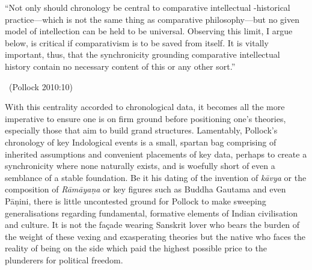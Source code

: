 \begin{myquote}
“Not only should chronology be central to comparative intellectual -historical practice—which is not the same thing as comparative philosophy—but no given model of intellection can be held to be universal. Observing this limit, I argue below, is critical if comparativism is to be saved from itself. It is vitally important, thus, that the synchronicity grounding comparative intellectual history contain no necessary content of this or any other sort.” 

~\hfill (Pollock 2010:10)
\end{myquote}

\newpage

With this centrality accorded to chronological data, it becomes all the more imperative to ensure one is on firm ground before positioning one’s theories, especially those that aim to build grand structures. Lamentably, Pollock’s chronology of key Indological events is a small, spartan bag comprising of inherited assumptions and convenient placements of key data, perhaps to create a synchronicity where none naturally exists, and is woefully short of even a semblance of a stable foundation. Be it his dating of the invention of \textit{kāvya} or the composition of \textit{Rāmāyaṇa} or key figures such as Buddha Gautama and even Pāṇini, there is little uncontested ground for Pollock to make sweeping generalisations regarding fundamental, formative elements of Indian civilisation and culture. It is not the façade wearing Sanskrit lover who bears the burden of the weight of these vexing and exasperating theories but the native who faces the reality of being on the side which paid the highest possible price to the plunderers for political freedom.

